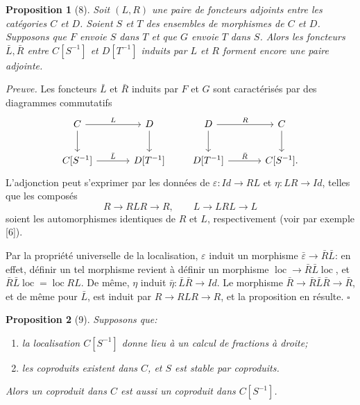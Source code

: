 \documentclass[11pt]{article}
\theoremstyle{deligne}
\newtheorem*{proposition*}{Proposition}
\newenvironment{proofdel}{\noindent\textit{Preuve.}}{\hfill$\square$}
\begin{document}
\begin{proposition*}[8]
Soit \((L,R)\) une paire de foncteurs adjoints entre les catégories \(C\) et \(D\). Soient \(S\) et \(T\) des ensembles de morphismes de \(C\) et \(D\). Supposons que \(F\) envoie \(S\) dans \(T\) et que \(G\) envoie \(T\) dans \(S\). Alors les foncteurs \(\bar L,\bar R\) entre \(C[S^{-1}]\) et \(D[T^{-1}]\) induits par \(L\) et \(R\) forment encore une paire adjointe.
\end{proposition*}

\begin{proofdel}
Les foncteurs \(\bar L\) et \(\bar R\) induits par \(F\) et \(G\) sont caractérisés par des diagrammes commutatifs
\[
\begin{tikzcd}[column sep=3.4em,row sep=2.2em]
C \arrow[r,"L"] \arrow[d] & D \arrow[d]\\
C[S^{-1}] \arrow[r,"\bar L"] & D[T^{-1}]
\end{tikzcd}
\qquad
\begin{tikzcd}[column sep=3.4em,row sep=2.2em]
D \arrow[r,"R"] \arrow[d] & C \arrow[d]\\
D[T^{-1}] \arrow[r,"\bar R"] & C[S^{-1}].
\end{tikzcd}
\]
L'adjonction peut s'exprimer par les données de \(\varepsilon:Id\to RL\) et \(\eta:LR\to Id\), telles que les composés
\[
R\longrightarrow RLR\longrightarrow R,\qquad
L\longrightarrow LRL\longrightarrow L
\]
soient les automorphismes identiques de \(R\) et \(L\), respectivement (voir par exemple [6]).

Par la propriété universelle de la localisation, \(\varepsilon\) induit un morphisme \(\bar\varepsilon\to\bar R\bar L\): en effet, définir un tel morphisme revient à définir un morphisme \(\operatorname{loc}\to\bar R\bar L\operatorname{loc}\), et \(\bar R\bar L\operatorname{loc}=\operatorname{loc}RL\). De même, \(\eta\) induit \(\bar\eta:\bar L\bar R\to Id\). Le morphisme \(\bar R\to\bar R\bar L\bar R\to\bar R\), et de même pour \(\bar L\), est induit par \(R\to RLR\to R\), et la proposition en résulte.
\end{proofdel}

\begin{proposition*}[9]
Supposons que:
\begin{enumerate}[label=\arabic*.]
\item la localisation \(C[S^{-1}]\) donne lieu à un calcul de fractions à droite;
\item les coproduits existent dans \(C\), et \(S\) est stable par coproduits.
\end{enumerate}
Alors un coproduit dans \(C\) est aussi un coproduit dans \(C[S^{-1}]\).
\end{proposition*}
\end{document}
